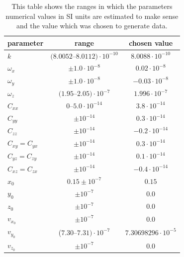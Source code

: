 \documentclass[]{rsos}
\begin{document}
\begin{table}%
	\centering
	\caption{This table shows the ranges in which the parameters numerical values in SI units are estimated to make sense and the value which was chosen to generate data.}
		\begin{tabular}{l c c}
			parameter & range & chosen value \\
			\hline	%
			$k$ & $(8.0052$--$8.0112) \cdot 10^{-10}$ & $8.0088 \cdot 10^{-10}$ \\
			$\omega_x$ & $\pm 1.0 \cdot 10^{-8}$ & $0.02 \cdot 10^{-8}$ \\
			$\omega_y$ & $\pm 1.0 \cdot 10^{-8}$ & $-0.03 \cdot 10^{-8}$ \\
			$\omega_z$ & $(1.95$--$2.05) \cdot 10^{-7}$ & $1.996 \cdot 10^{-7}$ \\
			$C_{xx}$ & $0$--$5.0 \cdot 10^{-14}$ & $3.8 \cdot 10^{-14}$ \\
			$C_{yy}$ & $\pm 10^{-14}$ & $0.3 \cdot 10^{-14}$ \\
			$C_{zz}$ & $\pm 10^{-14}$ & $-0.2 \cdot 10^{-14}$ \\
			$C_{xy} = C_{yx}$ & $\pm 10^{-14}$ & $0.3 \cdot 10^{-14}$ \\
			$C_{yz} = C_{zy}$ & $\pm 10^{-14}$ & $0.1 \cdot 10^{-14}$ \\
			$C_{xz} = C_{zx}$ & $\pm 10^{-14}$ & $-0.4 \cdot 10^{-14}$ \\
			$x_0$ & $0.15 \pm 10^{-7}$ & $0.15$ \\
			$y_0$ & $\pm 10^{-7}$ & $0.0$ \\ 
			$z_0$ & $\pm 10^{-7}$ & $0.0$ \\ 
			$v_{x_0}$ & $\pm 10^{-7}$ & $0.0$ \\ 
			$v_{y_0}$ & ($7.30$--$7.31) \cdot 10^{-7}$ & $7.30698296 \cdot 10^{-5}$ \\
			$v_{z_0}$ & $\pm 10^{-7}$ & $0.0$ \\
		\end{tabular}
	\label{tab:parameters}
\end{table}
\end{document}
